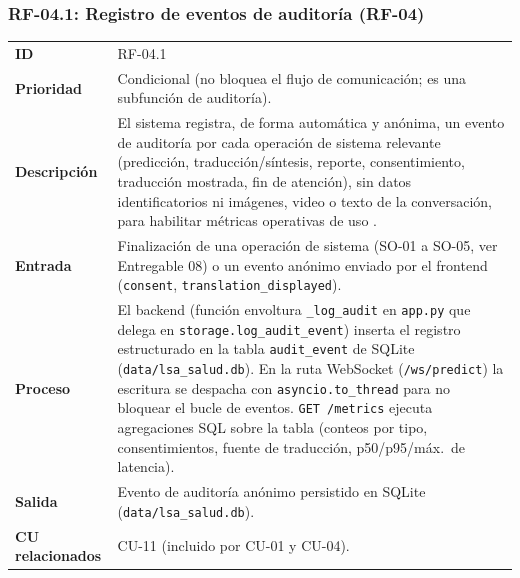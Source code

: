 \subsubsection{RF-04.1: Registro de eventos de auditoría (RF-04)}
\begin{table}[H]
\centering
\begin{tabularx}{\textwidth}{l X}
\toprule
\textbf{ID} & RF-04.1 \\
\textbf{Prioridad} & Condicional (no bloquea el flujo de comunicación; es una subfunción de auditoría). \\
\textbf{Descripción} & El sistema registra, de forma automática y anónima, un evento de auditoría por cada operación de sistema relevante (predicción, traducción/síntesis, reporte, consentimiento, traducción mostrada, fin de atención), sin datos identificatorios ni imágenes, video o texto de la conversación, para habilitar métricas operativas de uso . \\
\textbf{Entrada} & Finalización de una operación de sistema (SO-01 a SO-05, ver Entregable 08) o un evento anónimo enviado por el frontend (\texttt{consent}, \texttt{translation\_displayed}). \\
\textbf{Proceso} & El backend (función envoltura \texttt{\_log\_audit} en \texttt{app.py} que delega en \texttt{storage.log\_audit\_event}) inserta el registro estructurado en la tabla \texttt{audit\_event} de SQLite (\texttt{data/lsa\_salud.db}). En la ruta WebSocket (\texttt{/ws/predict}) la escritura se despacha con \texttt{asyncio.to\_thread} para no bloquear el bucle de eventos. \texttt{GET /metrics} ejecuta agregaciones SQL sobre la tabla (conteos por tipo, consentimientos, fuente de traducción, p50/p95/máx.\ de latencia). \\
\textbf{Salida} & Evento de auditoría anónimo persistido en SQLite (\texttt{data/lsa\_salud.db}). \\
\textbf{CU relacionados} & CU-11 (incluido por CU-01 y CU-04). \\
\bottomrule
\end{tabularx}
\end{table}

